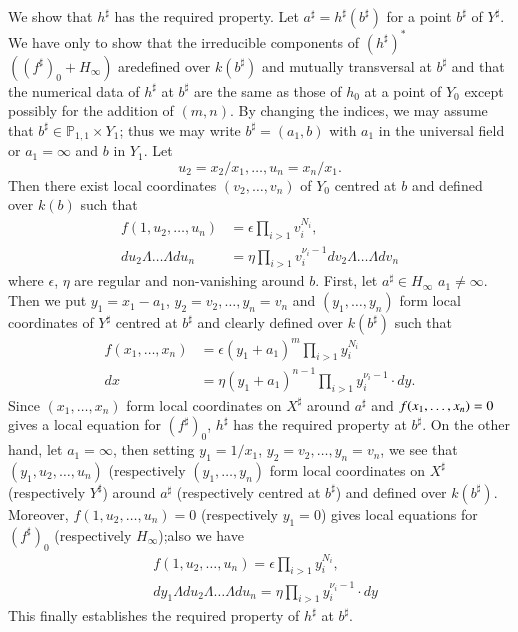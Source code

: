 We show that $h^{\sharp}$ has the required property. Let
$a^{\sharp}=h^{\sharp}(b^{\sharp})$ for a point $b^{\sharp}$ of
$Y^{\sharp}$. We have only to show that the irreducible components of
$(h^{\sharp})^{\ast}$ $((f^{\sharp})_{0}+H_{\infty})$
are\pageoriginale defined over $k(b^{\sharp})$ and mutually
transversal at $b^{\sharp}$ and that the numerical data of
$h^{\sharp}$ at $b^{\sharp}$ are the same as those of $h_{0}$ at a
point of $Y_{0}$ except possibly for the addition of $(m,n)$. By
changing the indices, we may assume that
$b^{\sharp}\in\mathbb{P}_{1,1}\times Y_{1}$; thus we may write
$b^{\sharp}=(a_{1},b)$ with $a_{1}$ in the universal field or
$a_{1}=\infty$ and $b$ in $Y_{1}$. Let
$$
u_{2}=x_{2}/x_{1},\ldots,u_{n}=x_{n}/x_{1}.
$$
Then there exist local coordinates $(v_{2},\ldots,v_{n})$ of $Y_{0}$
centred at $b$ and defined over $k(b)$ such that
\begin{align*}
  f(1,u_{2},\ldots,u_{n}) &=\epsilon\prod_{i>1}v^{N_{i}}_{i},\\
  du_{2}\Lambda\ldots\Lambda du_{n} &= \eta
  \prod_{i>1}v^{\nu_{i}-1}_{i}dv_{2}\Lambda\ldots\Lambda dv_{n}
\end{align*}
where $\epsilon$, $\eta$ are regular and non-vanishing around
$b$. First, let $a^{\sharp}\in H_{\infty}$ \ie $a_{1}\neq
\infty$. Then we put $y_{1}=x_{1}-a_{1}$,
$y_{2}=v_{2},\ldots,y_{n}=v_{n}$ and $(y_{1},\ldots,y_{n})$ form local
coordinates of $Y^{\sharp}$ centred at $b^{\sharp}$ and clearly
defined over $k(b^{\sharp})$ such that
\begin{align*}
  f(x_{1},\ldots,x_{n}) &=
  \epsilon(y_{1}+a_{1})^{m}\prod_{i>1}y^{N_{i}}_{i}\\
  dx &= \eta(y_{1}+a_{1})^{n-1}\prod_{i>1}y^{\nu_{i}-1}_{i}\cdot dy.
\end{align*}
Since $(x_{1},\ldots,x_{n})$ form local coordinates on $X^{\sharp}$
around $a^{\sharp}$ and $f(x_{1},\ldots,\break x_{n})=0$ gives a local
equation for $(f^{\sharp})_{0}$, $h^{\sharp}$ has the required
property at $b^{\sharp}$. On the other hand, let $a_{1}=\infty$, then
setting $y_{1}=1/x_{1}$, $y_{2}=v_{2},\ldots,y_{n}=v_{n}$, we see that
$(y_{1},u_{2},\ldots,u_{n})$ (respectively $(y_{1},\ldots,y_{n})$ form
local coordinates on $X^{\sharp}$ (respectively $Y^{\sharp}$) around
$a^{\sharp}$ (respectively centred at $b^{\sharp}$) and defined over
$k(b^{\sharp})$. Moreover, $f(1,u_{2},\ldots,u_{n})=0$ (respectively
$y_{1}=0$) gives local equations for $(f^{\sharp})_{0}$ (respectively
$H_{\infty}$);\pageoriginale also we have 
\begin{align*}
  & f(1,u_{2},\ldots,u_{n})=\epsilon\prod_{i>1}y^{N_{i}}_{i},\\
  & dy_{1}\Lambda du_{2}\Lambda\ldots\Lambda
  du_{n}=\eta\prod_{i>1}y^{\nu_{i}-1}_{i}\cdot dy
\end{align*}
This finally establishes the required property of $h^{\sharp}$ at
$b^{\sharp}$.

